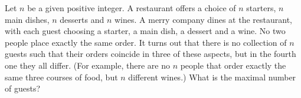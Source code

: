 Let $n$ be a given positive integer.
A restaurant offers a choice of $n$ starters, $n$ main dishes, $n$ desserts and $n$ wines.
A merry company dines at the restaurant, with each guest choosing a starter, a main dish, a dessert and a wine.
No two people place exactly the same order.
It turns out that there is no collection of $n$ guests such that their orders coincide in three of these aspects,
but in the fourth one they all differ. (For example, there are no $n$ people that order exactly the same three courses of food, but $n$ different wines.) What is the maximal number of guests?